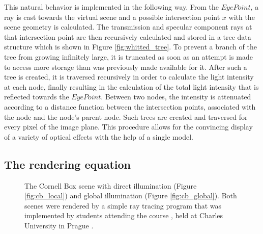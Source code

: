 This natural behavior is implemented in the following way. From the $Eye Point$, a ray is cast towards the virtual scene and a possible intersection point $x$ with the scene geometry is calculated. 
The transmission and specular component rays at that intersection point are then recursively calculated and stored in a tree data structure which is shown in Figure \ref{fig:whitted_tree}. 
To prevent a branch of the tree from growing infinitely large, it is truncated as soon as an attempt is made to access more storage than was previously made available for it. After such a tree is created, it is traversed recursively in order to calculate the light intensity at each node, finally resulting in the calculation of the total light intensity that is reflected towards the $Eye Point$. Between two nodes, the intensity is attenuated according to a distance function between the intersection points, associated with the node and the node's parent node. 
Such trees are created and traversed for every pixel of the image plane. This procedure allows for the convincing display of a variety of optical effects with the help of a single model.

\subsection{The rendering equation}

\begin{figure}
	\centering
	\hfil
	\caption{The Cornell Box scene with direct illumination (Figure \ref{fig:cb_local}) and global illumination (Figure \ref{fig:cb_global}). Both scenes were rendered by a simple ray tracing program that was implemented by students attending the course , held at Charles University in Prague \cite{cg3}.}
	\label{fig:cb}
\end{figure}

